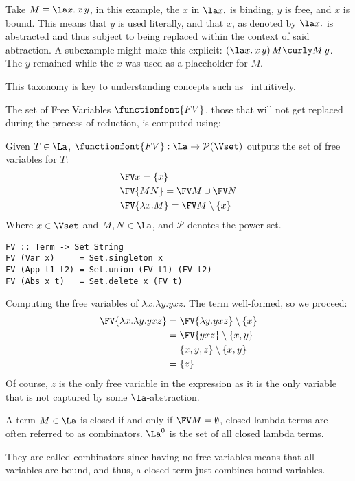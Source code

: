 \begin{example}
  Take $ M \equiv \la x . \, x \, y $, in this example, the $x$ in $\la x. $ is binding, $y$ is free, and $x$ is bound. This means that $y$ is used literally, and that $x$, as denoted by $\la x.$ is abstracted and thus subject to being replaced within the context of said abtraction. A subexample might make this explicit: $ (\la x . \, x \, y) \, M \curly M \, y $. The $y$ remained while the $x$ was used as a placeholder for $M$.
\end{example}
\begin{remark}
  This taxonomy is key to understanding concepts such as \aequiv \ intuitively.
\end{remark}
The set of Free Variables $\functionfont{FV}$, those that will not get replaced during the process of reduction, is computed using:
\begin{definition} Given $T \in \La $, $\functionfont{FV} : \La \to \mathcal{P}(\Vset) $ outputs the set of free variables for $T$:
  \begin{align*}
    & \FV x = \{x\}\\
    & \FV {MN} = \FV M \cup \FV N \\
    & \FV {\lambda x . M} = \FV M \setminus \{x\}
  \end{align*}
  Where $ x \in \Vset $ and $ M, N \in \La $, and $\mathcal{P}$ denotes the power set.
  \begin{lstlisting}[style=haskellstyle,caption={Implementation of FV in Haskell.}]
FV :: Term -> Set String
FV (Var x)     = Set.singleton x
FV (App t1 t2) = Set.union (FV t1) (FV t2)
FV (Abs x t)   = Set.delete x (FV t)
  \end{lstlisting}
\end{definition}
\begin{example} Computing the free variables of $\lambda x . \lambda y . y x z$. The term well-formed, so we proceed:
  \begin{align*}
    \FV {\lambda x . \lambda y . y x z} &= \FV {\lambda y . yxz} \setminus \{x\} \\
                                        &= \FV {yxz} \setminus \{x, y\} \\
                                        &= \{x, y, z\} \setminus \{x, y\} \\
                                        &= \{z\}
  \end{align*}
  Of course, $z$ is the only free variable in the expression as it is the only variable that is not captured by some $\la$-abstraction.
\end{example}
\begin{definition}
  A term $M \in \La$ is closed if and only if $\FV M = \emptyset$, closed lambda terms are often referred to as combinators. $\La^0$ is the set of all closed lambda terms.
\end{definition}
\begin{note} They are called combinators since having no free variables means that all variables are bound, and thus, a closed term just combines bound variables.
\end{note}

